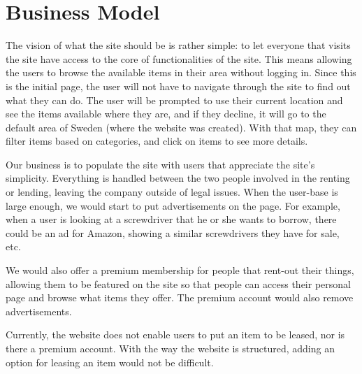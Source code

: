 \documentclass[a4paper]{article}
\begin{document}
\section{Business Model}
The vision of what the site should be is rather simple: to let everyone that visits the site have access to the core of functionalities of the site. This means allowing the users to browse the available items in their area without logging in. Since this is the initial page, the user will not have to navigate through the site to find out what they can do. The user will be prompted to use their current location and see the items available where they are, and if they decline, it will go to the default area of Sweden (where the website was created). With that map, they can filter items based on categories, and click on items to see more details.

Our business is to populate the site with users that appreciate the site's simplicity. Everything is handled between the two people involved in the renting or lending, leaving the company outside of legal issues. When the user-base is large enough, we would start to put advertisements on the page. For example, when a user is looking at a screwdriver that he or she wants to borrow, there could be an ad for Amazon, showing a similar screwdrivers they have for sale, etc. 

We would also offer a premium membership for people that rent-out their things, allowing them to be featured on the site so that people can access their personal page and browse what items they offer. The premium account would also remove advertisements.

Currently, the website does not enable users to put an item to be leased, nor is there a premium account. With the way the website is structured, adding an option for leasing an item would not be difficult. 
\end{document}
